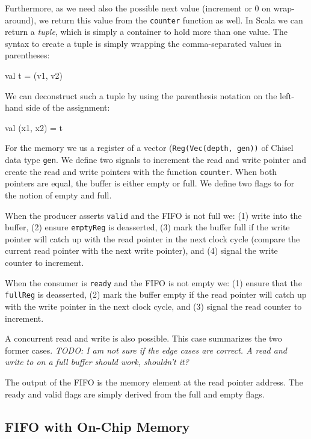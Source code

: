 \documentclass[%
    10pt,
    headinclude, footinclude=false,
    openright, %
    notitlepage,
    cleardoublepage=empty,
    headsepline,
    numbers=noenddot,
    bibliography=totoc, index=totoc,
    ]{scrbook}
\newcommand{\code}[1]{{\lstinline[basicstyle=\small\ttfamily]{#1}}}
\newcommand{\todo}[1]{{\emph{TODO: #1}}}
\begin{document}
Furthermore, as we need also the
possible next value (increment or 0 on wrap-around), we return this value from
the \code{counter} function as well. In Scala we can return a \emph{tuple},
which is simply a container to hold more than one value. The syntax to create
a tuple is simply wrapping the comma-separated values in parentheses:

\begin{chisel}
  val t = (v1, v2)
\end{chisel}

\noindent We can deconstruct such a tuple by using the parenthesis notation
on the left-hand side of the assignment:

\begin{chisel}
val (x1, x2) = t
\end{chisel}

For the memory we us a register of a vector (\code{Reg(Vec(depth, gen))} of
Chisel data type \code{gen}. We define two signals to increment the read and
write pointer and create the read and write pointers with the function \code{counter}.
When both pointers are equal, the buffer is either empty or full.
We define two flags to for the notion of empty and full.

When the producer asserts \code{valid} and the FIFO is not full we:
(1) write into the buffer, (2) ensure \code{emptyReg} is deasserted,
(3) mark the buffer full if the write pointer will catch up with the read pointer
in the next clock cycle (compare the current read pointer with the next
write pointer), and (4) signal the write counter to increment.

When the consumer is \code{ready} and the FIFO is not empty we:
(1) ensure that the \code{fullReg} is deasserted, (2) mark the buffer
empty if the read pointer will catch up with the write pointer in
the next clock cycle, and (3) signal the read counter to increment.

A concurrent read and write is also possible. This case summarizes
the two former cases. \todo{I am not sure if the edge cases are correct.
A read and write to on a full buffer should work, shouldn't it?}

The output of the FIFO is the memory element at the read pointer address.
The ready and valid flags are simply derived from the full and empty
flags.

\subsection{FIFO with On-Chip Memory}
\end{document}
